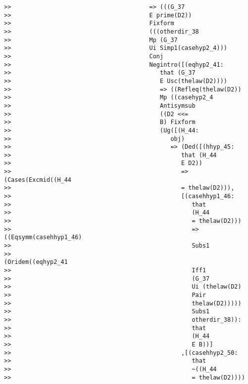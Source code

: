 \documentclass[12pt]{article}
\begin{document}
\begin{verbatim}
>>                                       => (((G_37
>>                                       E prime(D2))
>>                                       Fixform
>>                                       (((otherdir_38
>>                                       Mp (G_37
>>                                       Ui Simp1(casehyp2_4)))
>>                                       Conj
>>                                       Negintro([(eqhyp2_41:
>>                                          that (G_37
>>                                          E Usc(thelaw(D2))))
>>                                          => ((Refleq(thelaw(D2))
>>                                          Mp ((casehyp2_4
>>                                          Antisymsub
>>                                          ((D2 <<=
>>                                          B) Fixform
>>                                          (Ug([(H_44:
>>                                             obj)
>>                                             => (Ded([(hhyp_45:
>>                                                that (H_44
>>                                                E D2))
>>                                                => (Cases(Excmid((H_44
>>                                                = thelaw(D2))),
>>                                                [(casehhyp1_46:
>>                                                   that
>>                                                   (H_44
>>                                                   = thelaw(D2)))
>>                                                   => ((Eqsymm(casehhyp1_46)
>>                                                   Subs1
>>                                                   (Oridem((eqhyp2_41
>>                                                   Iff1
>>                                                   (G_37
>>                                                   Ui (thelaw(D2)
>>                                                   Pair
>>                                                   thelaw(D2)))))
>>                                                   Subs1
>>                                                   otherdir_38)):
>>                                                   that
>>                                                   (H_44
>>                                                   E B))]
>>                                                ,[(casehhyp2_50:
>>                                                   that
>>                                                   ~((H_44
>>                                                   = thelaw(D2))))

\end{verbatim}
\end{document}
